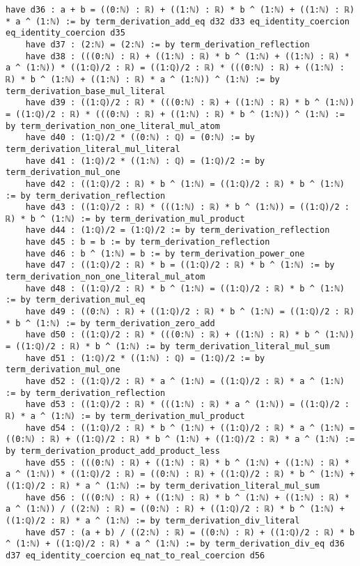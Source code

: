 \documentclass{article}
\begin{document}
\begin{tcolorbox}[colback=white!10, width=\linewidth]
\begin{lstlisting}[language=Lean4]
    have d36 : a + b = ((0:ℕ) : ℝ) + ((1:ℕ) : ℝ) * b ^ (1:ℕ) + ((1:ℕ) : ℝ) * a ^ (1:ℕ) := by term_derivation_add_eq d32 d33 eq_identity_coercion eq_identity_coercion d35
    have d37 : (2:ℕ) = (2:ℕ) := by term_derivation_reflection
    have d38 : (((0:ℕ) : ℝ) + ((1:ℕ) : ℝ) * b ^ (1:ℕ) + ((1:ℕ) : ℝ) * a ^ (1:ℕ)) * ((1:ℚ)/2 : ℝ) = ((1:ℚ)/2 : ℝ) * (((0:ℕ) : ℝ) + ((1:ℕ) : ℝ) * b ^ (1:ℕ) + ((1:ℕ) : ℝ) * a ^ (1:ℕ)) ^ (1:ℕ) := by term_derivation_base_mul_literal
    have d39 : ((1:ℚ)/2 : ℝ) * (((0:ℕ) : ℝ) + ((1:ℕ) : ℝ) * b ^ (1:ℕ)) = ((1:ℚ)/2 : ℝ) * (((0:ℕ) : ℝ) + ((1:ℕ) : ℝ) * b ^ (1:ℕ)) ^ (1:ℕ) := by term_derivation_non_one_literal_mul_atom
    have d40 : (1:ℚ)/2 * ((0:ℕ) : ℚ) = (0:ℕ) := by term_derivation_literal_mul_literal
    have d41 : (1:ℚ)/2 * ((1:ℕ) : ℚ) = (1:ℚ)/2 := by term_derivation_mul_one
    have d42 : ((1:ℚ)/2 : ℝ) * b ^ (1:ℕ) = ((1:ℚ)/2 : ℝ) * b ^ (1:ℕ) := by term_derivation_reflection
    have d43 : ((1:ℚ)/2 : ℝ) * (((1:ℕ) : ℝ) * b ^ (1:ℕ)) = ((1:ℚ)/2 : ℝ) * b ^ (1:ℕ) := by term_derivation_mul_product
    have d44 : (1:ℚ)/2 = (1:ℚ)/2 := by term_derivation_reflection
    have d45 : b = b := by term_derivation_reflection
    have d46 : b ^ (1:ℕ) = b := by term_derivation_power_one
    have d47 : ((1:ℚ)/2 : ℝ) * b = ((1:ℚ)/2 : ℝ) * b ^ (1:ℕ) := by term_derivation_non_one_literal_mul_atom
    have d48 : ((1:ℚ)/2 : ℝ) * b ^ (1:ℕ) = ((1:ℚ)/2 : ℝ) * b ^ (1:ℕ) := by term_derivation_mul_eq
    have d49 : ((0:ℕ) : ℝ) + ((1:ℚ)/2 : ℝ) * b ^ (1:ℕ) = ((1:ℚ)/2 : ℝ) * b ^ (1:ℕ) := by term_derivation_zero_add
    have d50 : ((1:ℚ)/2 : ℝ) * (((0:ℕ) : ℝ) + ((1:ℕ) : ℝ) * b ^ (1:ℕ)) = ((1:ℚ)/2 : ℝ) * b ^ (1:ℕ) := by term_derivation_literal_mul_sum
    have d51 : (1:ℚ)/2 * ((1:ℕ) : ℚ) = (1:ℚ)/2 := by term_derivation_mul_one
    have d52 : ((1:ℚ)/2 : ℝ) * a ^ (1:ℕ) = ((1:ℚ)/2 : ℝ) * a ^ (1:ℕ) := by term_derivation_reflection
    have d53 : ((1:ℚ)/2 : ℝ) * (((1:ℕ) : ℝ) * a ^ (1:ℕ)) = ((1:ℚ)/2 : ℝ) * a ^ (1:ℕ) := by term_derivation_mul_product
    have d54 : ((1:ℚ)/2 : ℝ) * b ^ (1:ℕ) + ((1:ℚ)/2 : ℝ) * a ^ (1:ℕ) = ((0:ℕ) : ℝ) + ((1:ℚ)/2 : ℝ) * b ^ (1:ℕ) + ((1:ℚ)/2 : ℝ) * a ^ (1:ℕ) := by term_derivation_product_add_product_less
    have d55 : (((0:ℕ) : ℝ) + ((1:ℕ) : ℝ) * b ^ (1:ℕ) + ((1:ℕ) : ℝ) * a ^ (1:ℕ)) * ((1:ℚ)/2 : ℝ) = ((0:ℕ) : ℝ) + ((1:ℚ)/2 : ℝ) * b ^ (1:ℕ) + ((1:ℚ)/2 : ℝ) * a ^ (1:ℕ) := by term_derivation_literal_mul_sum
    have d56 : (((0:ℕ) : ℝ) + ((1:ℕ) : ℝ) * b ^ (1:ℕ) + ((1:ℕ) : ℝ) * a ^ (1:ℕ)) / ((2:ℕ) : ℝ) = ((0:ℕ) : ℝ) + ((1:ℚ)/2 : ℝ) * b ^ (1:ℕ) + ((1:ℚ)/2 : ℝ) * a ^ (1:ℕ) := by term_derivation_div_literal
    have d57 : (a + b) / ((2:ℕ) : ℝ) = ((0:ℕ) : ℝ) + ((1:ℚ)/2 : ℝ) * b ^ (1:ℕ) + ((1:ℚ)/2 : ℝ) * a ^ (1:ℕ) := by term_derivation_div_eq d36 d37 eq_identity_coercion eq_nat_to_real_coercion d56

\end{lstlisting}
\end{tcolorbox}
\end{document}
